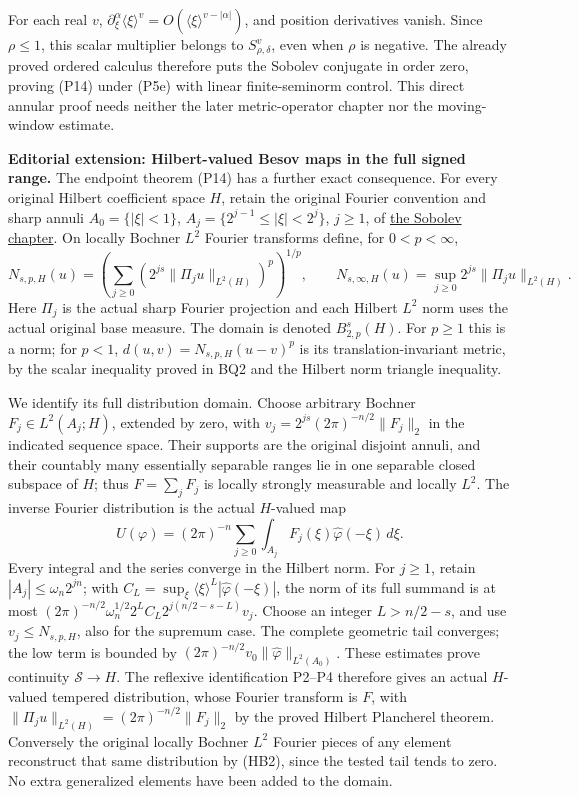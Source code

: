 \documentclass[
  11pt,
]{article}
\begin{document}
For each real \(v\),
\(\partial_\xi^\alpha\langle\xi\rangle^v=O(\langle\xi\rangle^{v-|\alpha|})\),
and position derivatives vanish. Since \(\rho\leq1\), this scalar
multiplier belongs to \(S^v_{\rho,\delta}\), even when \(\rho\) is
negative. The already proved ordered calculus therefore puts the Sobolev
conjugate in order zero, proving (P14) under (P5e) with linear
finite-seminorm control. This direct annular proof needs neither the
later metric-operator chapter nor the moving-window estimate.

\textbf{Editorial extension: Hilbert-valued Besov maps in the full
signed range.} The endpoint theorem (P14) has a further exact
consequence. For every original Hilbert coefficient space \(H\), retain
the original Fourier convention and sharp annuli \(A_0=\{|\xi|<1\}\),
\(A_j=\{2^{j-1}\le|\xi|<2^j\}\), \(j\ge1\), of
\href{euclidean-symbol-calculus.pdf\#section*.62}{the
Sobolev chapter}. On locally Bochner \(L^2\) Fourier transforms define,
for \(0<p<\infty\), \[
N_{s,p,H}(u)=\left(\sum_{j\ge0}(2^{js}\|\Pi_ju\|_{L^2(H)})^p\right)^{1/p},
\qquad N_{s,\infty,H}(u)=\sup_{j\ge0}2^{js}\|\Pi_ju\|_{L^2(H)}.
\tag{HB1}
\] Here \(\Pi_j\) is the actual sharp Fourier projection and each
Hilbert \(L^2\) norm uses the actual original base measure. The domain
is denoted \(B^s_{2,p}(H)\). For \(p\ge1\) this is a norm; for \(p<1\),
\(d(u,v)=N_{s,p,H}(u-v)^p\) is its translation-invariant metric, by the
scalar inequality proved in BQ2 and the Hilbert norm triangle
inequality.

We identify its full distribution domain. Choose arbitrary Bochner
\(F_j\in L^2(A_j;H)\), extended by zero, with
\(v_j=2^{js}(2\pi)^{-n/2}\|F_j\|_2\) in the indicated sequence space.
Their supports are the original disjoint annuli, and their countably
many essentially separable ranges lie in one separable closed subspace
of \(H\); thus \(F=\sum_jF_j\) is locally strongly measurable and
locally \(L^2\). The inverse Fourier distribution is the actual
\(H\)-valued map \[
U(\varphi)=(2\pi)^{-n}\sum_{j\ge0}
     \int_{A_j}F_j(\xi)\widehat\varphi(-\xi)\,d\xi.
\tag{HB2}
\] Every integral and the series converge in the Hilbert norm. For
\(j\ge1\), retain \(|A_j|\le\omega_n2^{jn}\); with
\(C_L=\sup_\xi\langle\xi\rangle^L|\widehat\varphi(-\xi)|\), the norm of
its full summand is at most
\((2\pi)^{-n/2}\omega_n^{1/2}2^LC_L2^{j(n/2-s-L)}v_j\). Choose an
integer \(L>n/2-s\), and use \(v_j\le N_{s,p,H}\), also for the supremum
case. The complete geometric tail converges; the low term is bounded by
\((2\pi)^{-n/2}v_0\|\widehat\varphi\|_{L^2(A_0)}\). These estimates
prove continuity \(\mathcal S\to H\). The reflexive identification
P2--P4 therefore gives an actual \(H\)-valued tempered distribution,
whose Fourier transform is \(F\), with
\(\|\Pi_ju\|_{L^2(H)}=(2\pi)^{-n/2}\|F_j\|_2\) by the proved Hilbert
Plancherel theorem. Conversely the original locally Bochner \(L^2\)
Fourier pieces of any element reconstruct that same distribution by
(HB2), since the tested tail tends to zero. No extra generalized
elements have been added to the domain.
\end{document}
